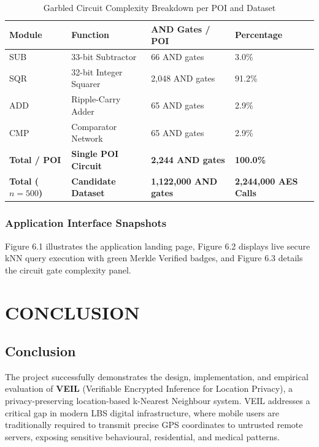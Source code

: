 \documentclass[12pt,a4paper,oneside]{report}
\begin{document}
\begin{table}[h!]
\centering
\caption{Garbled Circuit Complexity Breakdown per POI and Dataset}
\label{tab:gate_complexity}
\small
\begin{tabular}{p{3cm}p{4cm}p{3.5cm}p{3cm}}
\toprule
\textbf{Module} & \textbf{Function} & \textbf{AND Gates / POI} & \textbf{Percentage} \\
\midrule
SUB & 33-bit Subtractor & 66 AND gates & 3.0\% \\
SQR & 32-bit Integer Squarer & 2,048 AND gates & 91.2\% \\
ADD & Ripple-Carry Adder & 65 AND gates & 2.9\% \\
CMP & Comparator Network & 65 AND gates & 2.9\% \\
\midrule
\textbf{Total / POI} & \textbf{Single POI Circuit} & \textbf{2,244 AND gates} & \textbf{100.0\%} \\
\textbf{Total ($n=500$)} & \textbf{Candidate Dataset} & \textbf{1,122,000 AND gates} & \textbf{2,244,000 AES Calls} \\
\bottomrule
\end{tabular}
\end{table}

\subsection{Application Interface Snapshots}
Figure 6.1 illustrates the application landing page, Figure 6.2 displays live secure kNN query execution with green Merkle Verified badges, and Figure 6.3 details the circuit gate complexity panel.


\chapter{CONCLUSION}

\section{Conclusion}
The project successfully demonstrates the design, implementation, and empirical evaluation of \textbf{VEIL} (Verifiable Encrypted Inference for Location Privacy), a privacy-preserving location-based k-Nearest Neighbour system. VEIL addresses a critical gap in modern LBS digital infrastructure, where mobile users are traditionally required to transmit precise GPS coordinates to untrusted remote servers, exposing sensitive behavioural, residential, and medical patterns.
\end{document}
